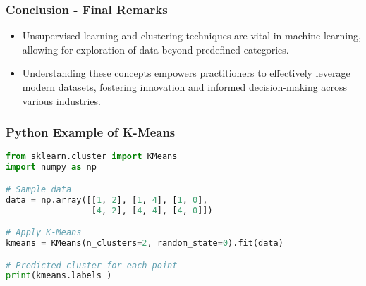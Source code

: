 \documentclass{beamer}
\begin{document}
\begin{frame}[fragile]
    \frametitle{Conclusion - Final Remarks}
    \begin{itemize}
        \item Unsupervised learning and clustering techniques are vital in machine learning, allowing for exploration of data beyond predefined categories.
        \item Understanding these concepts empowers practitioners to effectively leverage modern datasets, fostering innovation and informed decision-making across various industries.
    \end{itemize}
\end{frame}

\begin{frame}[fragile]
    \frametitle{Python Example of K-Means}
    \begin{lstlisting}[language=Python]
from sklearn.cluster import KMeans
import numpy as np

# Sample data
data = np.array([[1, 2], [1, 4], [1, 0],
                 [4, 2], [4, 4], [4, 0]])

# Apply K-Means
kmeans = KMeans(n_clusters=2, random_state=0).fit(data)

# Predicted cluster for each point
print(kmeans.labels_)
    \end{lstlisting}
\end{frame}
\end{document}
